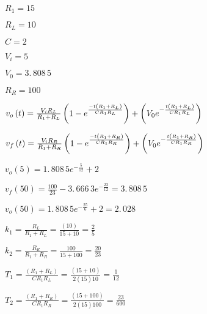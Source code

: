 \documentclass{article}
\begin{document}
\vspace{1pt}

\vspace{1pt}

\vspace{1pt}

\vspace{1pt}

\vspace{1pt}

\vspace{1pt}

\vspace{1pt}

\vspace{1pt}

$R_{1}=15$

$R_{L}=10$

$C=2$

$V_{i}=5$

$V_{0}=3.\,\allowbreak 808\,5$

$R_{R}=100$

$v_{o}\left( t\right) =\frac{V_{i}R_{L}}{R_{1}+R_{L}}\left( 1-e^{\frac{%
-t\left( R_{1}+R_{L}\right) }{CR_{1}R_{L}}}\right) +\left( V_{0}e^{-\frac{%
t\left( R_{1}+R_{L}\right) }{CR_{1}R_{L}}}\right) $

$v_{f}\left( t\right) =\frac{V_{i}R_{R}}{R_{1}+R_{R}}\left( 1-e^{\frac{%
-t\left( R_{1}+R_{R}\right) }{CR_{1}R_{R}}}\right) +\left( V_{0}e^{-\frac{%
t\left( R_{1}+R_{R}\right) }{CR_{1}R_{R}}}\right) $

$v_{o}(5)=\allowbreak 1.\,\allowbreak 808\,5e^{-\frac{5}{12}}+2$

$v_{f}\left( 50\right) \allowbreak =\allowbreak \frac{100}{23}%
-3.\,\allowbreak 666\,3e^{-\frac{23}{12}}\allowbreak =\allowbreak
3.\,\allowbreak 808\,5$

$v_{o}\left( 50\right) =\allowbreak 1.\,\allowbreak 808\,5e^{-\frac{25}{6}%
}+2=\allowbreak 2.\,\allowbreak 028$

$k_{1}=\frac{R_{L}}{R_{1}+R_{L}}=\frac{\left( 10\right) }{15+10}=\allowbreak 
\frac{2}{5}$

$k_{2}=\frac{R_{R}}{R_{1}+R_{R}}=\frac{100}{15+100}=\allowbreak \frac{20}{23}
$

$T_{1}=\frac{\left( R_{1}+R_{L}\right) }{CR_{1}R_{L}}=\frac{\left(
15+10\right) }{2\left( 15\right) 10}=\allowbreak \frac{1}{12}$

$T_{2}=\frac{\left( R_{1}+R_{R}\right) }{CR_{1}R_{R}}=\frac{\left(
15+100\right) }{2\left( 15\right) 100}=\allowbreak \frac{23}{600}$
\end{document}
